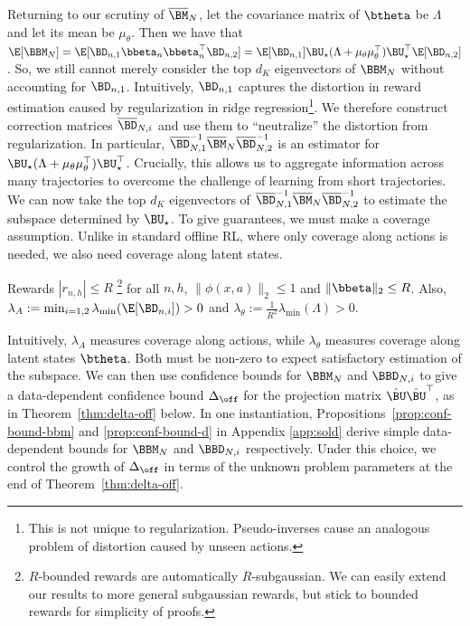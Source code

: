 Returning to our scrutiny of $\overline{\BM}_N$, let the covariance matrix of $\btheta$ be $\Lambda$ and let its mean be $\mu_\theta$. Then we have that $\E[\BBM_N] = \E[\BD_{n,1} \bbeta_{n}  \bbeta_{n}^\top \BD_{n,2}] = \E[\BD_{n,1}]\BU_\star(\Lambda + \mu_\theta \mu_\theta^\top) \BU_\star^\top\E[\BD_{n,2}]$. So, we still cannot merely consider the top $d_K$ eigenvectors of $\BBM_N$ without accounting for $\BD_{n,1}$.  
Intuitively, $\BD_{n,1}$ captures the distortion in reward estimation caused by regularization in ridge regression\footnote{This is not unique to regularization. Pseudo-inverses cause an analogous problem of distortion caused by unseen actions.}. We therefore construct correction matrices $\overline{\BD}_{N,i}$ and use them to ``neutralize'' the distortion from regularization. In particular, $\overline{\BD}_{N,1}^{-1} {\overline{\BM}_N} {\overline{\BD}_{N,2}^{-1}}$ is an estimator for $\BU_\star(\Lambda + \mu_\theta \mu_\theta^\top) \BU_\star^\top$. Crucially, this allows us to aggregate information across many trajectories to overcome the challenge of learning from short trajectories. We can now take the top $d_K$ eigenvectors of $\overline{\BD}_{N,1}^{-1} {\overline{\BM}_N} {\overline{\BD}_{N,2}^{-1}}$ to estimate the subspace determined by $\BU_\star$. To give guarantees, we must make a coverage assumption. Unlike in standard offline RL, where only coverage along actions is needed, we also need coverage along latent states.

\begin{assumption}\label{assum:coverage}
    Rewards $|r_{n,h}| \leq R$ \footnote{$R$-bounded rewards are automatically $R$-subgaussian. We can easily extend our results to more general subgaussian rewards, but stick to bounded rewards for simplicity of proofs.} for all $n,h$, $\|\phi(x,a)\|_2 \leq 1$ and $\|\bbeta\|_2 \leq R$. Also, $\lambda_A := \min_{i=1,2} \lambda_{\min}(\E[\BD_{n,i}]) >0$ and $\lambda_{\theta} := \frac{1}{R^2}\lambda_{\min}(\Lambda) > 0$.
\end{assumption}

Intuitively, $\lambda_A$ measures coverage along actions, while $\lambda_{\theta}$ measures coverage along latent states $\btheta$. Both must be non-zero to expect satisfactory estimation of the subspace. We can then use confidence bounds for $\BBM_{N}$ and $\BBD_{N,i}$ to give a data-dependent confidence bound $\Delta_{\off}$ for the projection matrix $\hat \BU \hat \BU^\top$, as in Theorem~\ref{thm:delta-off} below. In one instantiation, Propositions~\ref{prop:conf-bound-bbm} and \ref{prop:conf-bound-d} in Appendix \ref{app:sold} derive simple data-dependent bounds for $\BBM_N$ and $\BBD_{N,i}$ respectively. Under this choice, we control the growth of $\Delta_{\off}$ in terms of the unknown problem parameters at the end of Theorem~\ref{thm:delta-off}.

